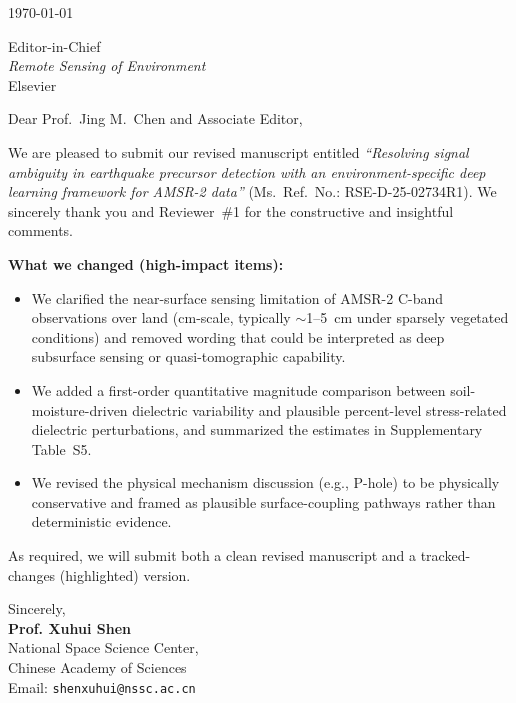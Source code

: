 \documentclass[11pt]{article}
\begin{document}
\begin{flushright}
\today
\end{flushright}

\bigskip

Editor-in-Chief\\
\textit{Remote Sensing of Environment}\\
Elsevier

\bigskip

Dear Prof.~Jing M.~Chen and Associate Editor,

\medskip

We are pleased to submit our revised manuscript entitled \textit{``Resolving signal ambiguity in earthquake precursor detection with an environment-specific deep learning framework for AMSR-2 data''} (Ms.\ Ref.\ No.: RSE-D-25-02734R1). We sincerely thank you and Reviewer~\#1 for the constructive and insightful comments.

\medskip

\noindent\textbf{What we changed (high-impact items):}
\begin{itemize}[leftmargin=*, nosep]
  \item We clarified the near-surface sensing limitation of AMSR-2 C-band observations over land (cm-scale, typically $\sim$1--5~cm under sparsely vegetated conditions) and removed wording that could be interpreted as deep subsurface sensing or quasi-tomographic capability.
  \item We added a first-order quantitative magnitude comparison between soil-moisture-driven dielectric variability and plausible percent-level stress-related dielectric perturbations, and summarized the estimates in Supplementary Table~S5.
  \item We revised the physical mechanism discussion (e.g., P-hole) to be physically conservative and framed as plausible surface-coupling pathways rather than deterministic evidence.
\end{itemize}

\medskip

As required, we will submit both a clean revised manuscript and a tracked-changes (highlighted) version.

\medskip

Sincerely,\\[0.5em]
\textbf{Prof. Xuhui Shen}\\
National Space Science Center,\\
Chinese Academy of Sciences\\
Email: \texttt{shenxuhui@nssc.ac.cn}
\end{document}
